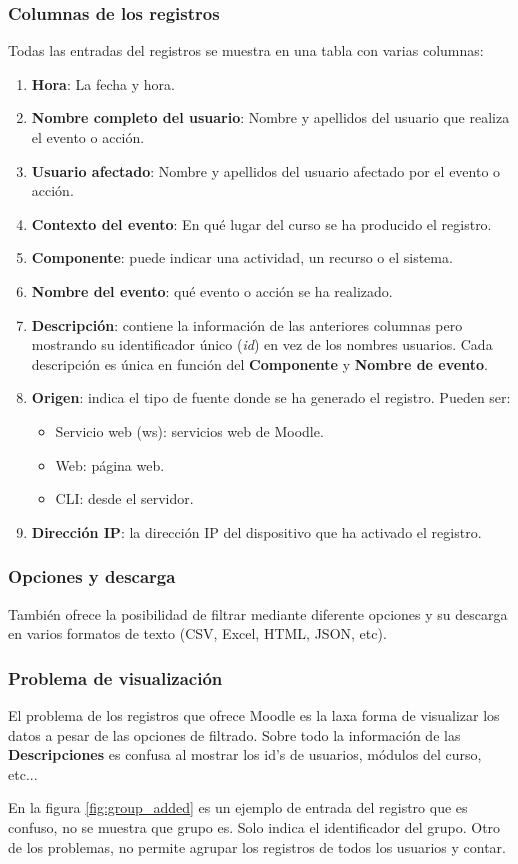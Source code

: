 \subsubsection{Columnas de los registros}
Todas las entradas del registros se muestra en una tabla con varias columnas: 
\begin{enumerate}
	\item \textbf{Hora}: La fecha y hora.
	\item \textbf{Nombre completo del usuario}: Nombre y apellidos del usuario que realiza el evento o acción.
	\item \textbf{Usuario afectado}: Nombre y apellidos del usuario afectado por el evento o acción.
	\item \textbf{Contexto del evento}: En qué lugar del curso se ha producido el registro.
	\item \textbf{Componente}: puede indicar una actividad, un recurso o el sistema.
	\item \textbf{Nombre del evento}: qué evento o acción se ha realizado.
	\item \textbf{Descripción}: contiene la información de las anteriores columnas pero mostrando su identificador único (\textit{id}) en vez de los nombres usuarios. Cada descripción es única en función del \textbf{Componente} y \textbf{Nombre de evento}.
	\item \textbf{Origen}: indica el tipo de fuente donde se ha generado el registro. Pueden ser:
	\begin{itemize}
		\item Servicio web (ws): servicios web de Moodle.
		\item Web: página web.
		\item CLI: desde el servidor.
	\end{itemize}
	\item \textbf{Dirección IP}: la dirección IP del dispositivo que ha activado el registro.
	
\end{enumerate}

\subsubsection{Opciones y descarga}
También ofrece la posibilidad de filtrar mediante diferente opciones y su descarga en varios formatos de texto (CSV, Excel, HTML, JSON, etc).

\subsubsection{Problema de visualización}

El problema de los registros que ofrece Moodle es la laxa forma de visualizar los datos a pesar de las opciones de filtrado. Sobre todo la información de las \textbf{Descripciones} es confusa al mostrar los id's de usuarios, módulos del curso, etc...

En la figura \ref{fig:group_added} es un ejemplo de entrada del registro que es confuso, no se muestra que grupo es. Solo indica el identificador del grupo. Otro de los problemas, no permite agrupar los registros de todos los usuarios y contar.



